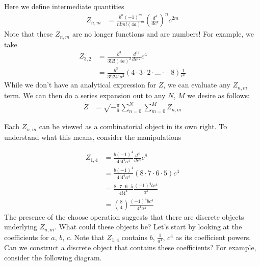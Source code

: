\documentclass[book.tex]{subfiles}
\begin{document}
Here we define intermediate quantities
\begin{align}
    Z_{n, m} &= \frac{b^n(-1)^m}{n!m!(4a)^m} \left ( \frac{d^4}{dc^4}\right )^n c^{2m} 
\end{align}
Note that these $Z_{n,m}$ are no longer functions and are numbers! For example, we take
\begin{align}
    Z_{3, 2} &= \frac{b^3}{3!2!(4a)^2} \frac{d^{12}}{dc^{12}} c^4 \\
    &= \frac{b^3}{3!2!4^2 a^2} (4\cdot 3 \cdot 2 \cdot \dotsc \cdot -8) \frac{1}{c^8}
\end{align}
While we don't have an analytical expression for $Z$, we can evaluate any $Z_{n,m}$ term. We can then do a series expansion out to any $N$, $M$ we desire as follows:
\begin{align}
    \tilde{Z} &= \sqrt{-\frac{\pi}{a}}\sum_{n=0}^N \sum_{m=0}^M Z_{n,m}
\end{align}

Each $Z_{n, m}$ can be viewed as a combinatorial object in its own right. To understand what this means, consider the manipulations 

\begin{align}
    Z_{1, 4} &= \frac{b(-1)^4}{4!4^4a^4} \frac{d^4}{dc^4} c^8 \\ 
    &= \frac{b(-1)^4}{4!4^4a^4} (8 \cdot 7 \cdot 6 \cdot 5) c^4 \\
    &= \frac{8\cdot 7 \cdot 6 \cdot 5}{4!4^4} \frac{(-1)^4bc^4}{a^4} \\
    &= \binom{8}{4} \frac{(-1)^4bc^4}{4^4a^4 }
\end{align}
The presence of the choose operation suggests that there are discrete objects underlying $Z_{n,m}$. What could these objects be? Let's start by looking at the coefficients for $a$, $b$, $c$. Note that $Z_{1,4}$ contains $b$, $\frac{1}{a^4}$, $c^4$ as its coefficient powers. Can we construct a discrete object that contains these coefficients? For example, consider the following diagram. \\

\end{document}
